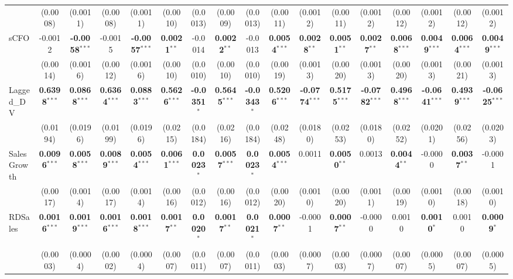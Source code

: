 \documentclass[11pt,a4paper]{article}
\begin{document}
\begin{table}[htbp]
\begin{tabular}{lcccccccccccccccc}
 & (0.0008) & (0.0011) & (0.0008) & (0.0011) & (0.0010) & (0.0013) & (0.0009) & (0.0013) & (0.0011) & (0.0012) & (0.0011) & (0.0012) & (0.0012) & (0.0012) & (0.0012) & (0.0012) \\
sCFO & -0.0012 & \textbf{-0.0058}$^{***}$ & -0.0015 & \textbf{-0.0057}$^{***}$ & \textbf{0.0021}$^{**}$ & -0.0014 & \textbf{0.0022}$^{**}$ & -0.0013 & \textbf{0.0054}$^{***}$ & \textbf{0.0028}$^{**}$ & \textbf{0.0051}$^{**}$ & \textbf{0.0027}$^{**}$ & \textbf{0.0068}$^{***}$ & \textbf{0.0049}$^{***}$ & \textbf{0.0064}$^{***}$ & \textbf{0.0049}$^{***}$ \\
 & (0.0014) & (0.0016) & (0.0012) & (0.0016) & (0.0010) & (0.0010) & (0.0010) & (0.0010) & (0.0019) & (0.0013) & (0.0020) & (0.0013) & (0.0020) & (0.0013) & (0.0021) & (0.0013) \\
Lagged\_DV & \textbf{0.6398}$^{***}$ & \textbf{0.0868}$^{***}$ & \textbf{0.6364}$^{***}$ & \textbf{0.0883}$^{***}$ & \textbf{0.5626}$^{***}$ & \textbf{-0.0351}$^{*}$ & \textbf{0.5645}$^{***}$ & \textbf{-0.0343}$^{*}$ & \textbf{0.5206}$^{***}$ & \textbf{-0.0774}$^{***}$ & \textbf{0.5175}$^{***}$ & \textbf{-0.0782}$^{***}$ & \textbf{0.4968}$^{***}$ & \textbf{-0.0641}$^{***}$ & \textbf{0.4939}$^{***}$ & \textbf{-0.0625}$^{***}$ \\
 & (0.0194) & (0.0196) & (0.0199) & (0.0196) & (0.0215) & (0.0184) & (0.0216) & (0.0184) & (0.0248) & (0.0180) & (0.0253) & (0.0180) & (0.0252) & (0.0201) & (0.0256) & (0.0203) \\
SalesGrowth & \textbf{0.0096}$^{***}$ & \textbf{0.0058}$^{***}$ & \textbf{0.0089}$^{***}$ & \textbf{0.0054}$^{***}$ & \textbf{0.0061}$^{***}$ & \textbf{0.0023}$^{*}$ & \textbf{0.0057}$^{***}$ & \textbf{0.0023}$^{*}$ & \textbf{0.0054}$^{***}$ & 0.0011 & \textbf{0.0050}$^{**}$ & 0.0013 & \textbf{0.0044}$^{**}$ & -0.0000 & \textbf{0.0037}$^{**}$ & -0.0001 \\
 & (0.0017) & (0.0014) & (0.0017) & (0.0014) & (0.0016) & (0.0012) & (0.0016) & (0.0012) & (0.0020) & (0.0010) & (0.0020) & (0.0011) & (0.0019) & (0.0010) & (0.0018) & (0.0010) \\
RDSales & \textbf{0.0016}$^{***}$ & \textbf{0.0019}$^{***}$ & \textbf{0.0016}$^{***}$ & \textbf{0.0018}$^{***}$ & \textbf{0.0017}$^{**}$ & \textbf{0.0020}$^{*}$ & \textbf{0.0017}$^{**}$ & \textbf{0.0021}$^{*}$ & \textbf{0.0007}$^{**}$ & -0.0001 & \textbf{0.0007}$^{**}$ & -0.0000 & 0.0010 & \textbf{0.0010}$^{*}$ & 0.0010 & \textbf{0.0009}$^{*}$ \\
 & (0.0003) & (0.0004) & (0.0002) & (0.0004) & (0.0007) & (0.0011) & (0.0007) & (0.0011) & (0.0003) & (0.0007) & (0.0003) & (0.0007) & (0.0007) & (0.0005) & (0.0007) & (0.0005) \\

\end{tabular}
\end{table}
\end{document}
